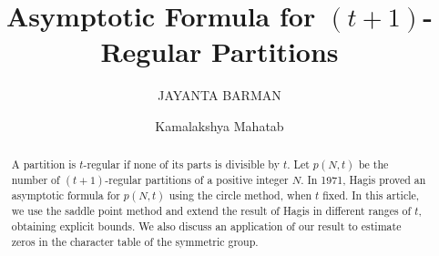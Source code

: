 \documentclass[11pt]{amsart}
\theoremstyle{plain}
\numberwithin{equation}{section}
\begin{document}
	\title[Asymptotic Formula for $(t+1)$-Regular Partitions]{Asymptotic Formula for $(t+1)$-Regular Partitions} 
	\author{JAYANTA BARMAN}
	\address{JAYANTA BARMAN\\ Department of Mathematics \\
		Indian Institute of Technology Kharagpur \\
		Kharagpur-721302, India.} 
	
	\author[Kamalakshya Mahatab]{Kamalakshya Mahatab}
	\address{Kamalakshya Mahatab\\ Department of Mathematics \\
		Indian Institute of Technology Kharagpur \\
		Kharagpur-721302, India.} 
	
	
	\begin{abstract}
		A partition is $t$-regular if none of its parts is divisible by $t$. Let $p(N,t)$ be the number of $(t+1)$-regular partitions of a positive integer $N$. In 1971, Hagis proved an asymptotic formula for $p(N,t)$ using the circle method, when $t$ fixed. In this article, we use the saddle point method and extend the result of Hagis in different ranges of $t$, obtaining explicit bounds. We also discuss an application of our result to estimate zeros in the character table of the symmetric group.
	\end{abstract}
	
	\maketitle
\end{document}
